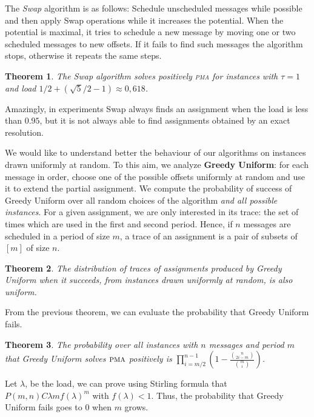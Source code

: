 \documentclass[10pt, conference, letterpaper]{algotel}
\newtheorem{theorem}{Theorem}
\newcommand\pma{\textsc{pma}\xspace}
\begin{document}
The \emph{Swap} algorithm is as follows: Schedule unscheduled messages while possible and then apply Swap operations while it increases the potential. When the potential is maximal, it tries to schedule a new message by moving one or two scheduled messages to new offsets. If it fails to find such messages the algorithm stops, otherwise it repeats the same steps. 

\begin{theorem}
The Swap algorithm solves positively \pma for instances with $\tau =1$ and load $1/2 + (\sqrt{5}/2 -1) \approx 0,618$.
\end{theorem}

Amazingly, in experiments Swap always finds an assignment when the load is less than $0.95$, but it is not always able to find assignments obtained by an exact resolution. 

We would like to understand better the behaviour of our algorithms
on instances drawn uniformly at random. To this aim, we analyze \textbf{Greedy Uniform}: for each message in order, choose one of the possible offsets uniformly at random and use it to extend the partial assignment. We compute the probability of success of Greedy Uniform over all random choices of the algorithm \emph{and all possible instances}. For a given assignment, we are only interested in its trace: the set of times which are used in the first and second period. Hence, if $n$ messages are scheduled in a period of size $m$, a trace of an assignment is a pair of subsets of $[m]$ of size $n$.

\begin{theorem}
The distribution of traces of assignments produced by Greedy Uniform when it succeeds, from instances drawn uniformly at random, is also uniform.
\end{theorem}

From the previous theorem, we can evaluate the probability that Greedy Uniform fails.

\begin{theorem}\label{theorem:uniform}
The probability over all instances with $n$ messages and period $m$ that Greedy Uniform solves $\pma$ positively is $\displaystyle{\prod_{i=m/2}^{n-1}(1 - \frac{\binom{n}{2i-m}}{\binom{m}{i}})}$.
\end{theorem}

Let $\lambda$, be the load, we can prove using Stirling formula that
$P(m,n) C \lambda m f(\lambda)^m$ with $f(\lambda) < 1$. Thus, the probability that Greedy Uniform fails goes to $0$ when $m$ grows. 



 
\end{document}
